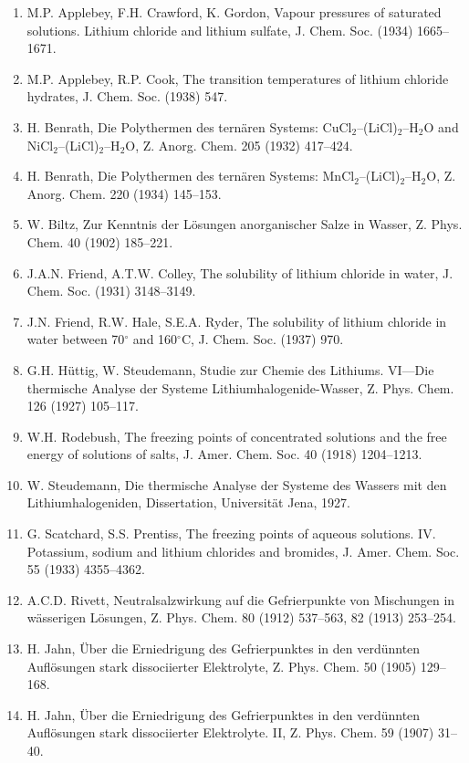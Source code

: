 \documentclass[11pt]{article}
\begin{document}
\begin{enumerate}
\footnotesize
\item M.P. Applebey, F.H. Crawford, K. Gordon, Vapour pressures of saturated solutions. Lithium chloride and lithium sulfate, J. Chem. Soc. (1934) 1665--1671.
\item M.P. Applebey, R.P. Cook, The transition temperatures of lithium chloride hydrates, J. Chem. Soc. (1938) 547.
\item H. Benrath, Die Polythermen des tern\"aren Systems: CuCl$_2$--(LiCl)$_2$--H$_2$O and NiCl$_2$--(LiCl)$_2$--H$_2$O, Z. Anorg. Chem. 205 (1932) 417--424.
\item H. Benrath, Die Polythermen des tern\"aren Systems: MnCl$_2$--(LiCl)$_2$--H$_2$O, Z. Anorg. Chem. 220 (1934) 145--153.
\item W. Biltz, Zur Kenntnis der L\"osungen anorganischer Salze in Wasser, Z. Phys. Chem. 40 (1902) 185--221.
\item J.A.N. Friend, A.T.W. Colley, The solubility of lithium chloride in water, J. Chem. Soc. (1931) 3148--3149.
\item J.N. Friend, R.W. Hale, S.E.A. Ryder, The solubility of lithium chloride in water between 70$^\circ$ and 160$^\circ$C, J. Chem. Soc. (1937) 970.
\item G.H. H\"uttig, W. Steudemann, Studie zur Chemie des Lithiums. VI---Die thermische Analyse der Systeme Lithiumhalogenide-Wasser, Z. Phys. Chem. 126 (1927) 105--117.
\item W.H. Rodebush, The freezing points of concentrated solutions and the free energy of solutions of salts, J. Amer. Chem. Soc. 40 (1918) 1204--1213.
\item W. Steudemann, Die thermische Analyse der Systeme des Wassers mit den Lithiumhalogeniden, Dissertation, Universit\"at Jena, 1927.
\item G. Scatchard, S.S. Prentiss, The freezing points of aqueous solutions. IV. Potassium, sodium and lithium chlorides and bromides, J. Amer. Chem. Soc. 55 (1933) 4355--4362.
\item A.C.D. Rivett, Neutralsalzwirkung auf die Gefrierpunkte von Mischungen in w\"asserigen L\"osungen, Z. Phys. Chem. 80 (1912) 537--563, 82 (1913) 253--254.
\item H. Jahn, \"Uber die Erniedrigung des Gefrierpunktes in den verd\"unnten Auflösungen stark dissociierter Elektrolyte, Z. Phys. Chem. 50 (1905) 129--168.
\item H. Jahn, \"Uber die Erniedrigung des Gefrierpunktes in den verd\"unnten Auflösungen stark dissociierter Elektrolyte. II, Z. Phys. Chem. 59 (1907) 31--40.

\end{enumerate}
\end{document}
